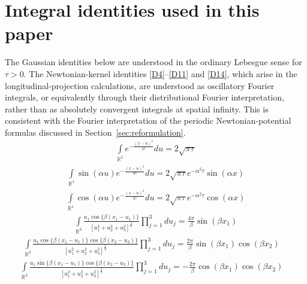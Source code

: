 \documentclass[11pt]{jfm}
\numberwithin{equation}{section}
\begin{document}
\section{Integral identities used in this paper}
\label{app:integrals}
The Gaussian identities below are understood in the ordinary Lebesgue sense for $\tau>0$. The
Newtonian-kernel identities \eqref{D4}--\eqref{D11} and \eqref{D14}, which arise in the
longitudinal-projection calculations, are understood as oscillatory Fourier integrals, or
equivalently through their distributional Fourier interpretation, rather than as absolutely
convergent integrals at spatial infinity. This is consistent with the Fourier interpretation of the periodic
Newtonian-potential formulas discussed in Section~\ref{sec:reformulation}.
\begin{eqnarray}
\label{D1}
\int\limits_{\mathbb{R}^1 } {{e^{ - \frac{{{{\left( {x - u} \right)}^2}}}{{4\tau }}}}} du = 2\sqrt {\pi \tau }
\end{eqnarray}
\begin{eqnarray}
\label{D2}
 \int\limits_{\mathbb{R}^1 }  {\sin \left( {\alpha u} \right){e^{ - \frac{{{{\left( {x - u} \right)}^2}}}{{4\tau }}}}} du = 2\sqrt {\pi \tau } {e^{ - {\alpha ^2}\tau }}\sin \left( {\alpha x} \right)
\end{eqnarray}
\begin{eqnarray}
\label{D3}
\int\limits_{\mathbb{R}^1 } {\cos \left( {\alpha u} \right){e^{ - \frac{{{{\left( {x - u} \right)}^2}}}{{4\tau }}}}} du = 2\sqrt {\pi \tau } {e^{ - {\alpha ^2}\tau }}\cos \left( {\alpha x} \right)
\end{eqnarray}
\begin{eqnarray}
\label{D4}
\int\limits_{\mathbb{R}^3 }{\frac{{u_1\cos\{\beta\left(x_1-u_1\right)\}}}{{\left[ u_1^2+u_2^2+u_3^2 \right]^{\frac{3}{2}} }}}\prod\limits_{j = 1}^3 {du_j }=\frac{4\pi}{\beta}\sin\left(\beta x_1\right)
\end{eqnarray}
\begin{eqnarray}
\label{D5}
\int\limits_{\mathbb{R}^3 }{\frac{{u_1\cos\{\beta\left(x_1-u_1\right)\}\cos\{\beta\left(x_2-u_2\right)\}}}{{\left[ u_1^2+u_2^2+u_3^2 \right]^{\frac{3}{2}} }}}\prod\limits_{j = 1}^3 {du_j }=\frac{2\pi}{\beta}\sin\left(\beta x_1\right)\cos\left(\beta x_2\right)\quad
\end{eqnarray}
\begin{eqnarray}
\label{D6}
\int\limits_{\mathbb{R}^3 }{\frac{{u_1\sin\{\beta\left(x_1-u_1\right)\}\cos\{\beta\left(x_2-u_2\right)\}}}{{\left[ u_1^2+u_2^2+u_3^2 \right]^{\frac{3}{2}} }}}\prod\limits_{j = 1}^3 {du_j }=-\frac{2\pi}{\beta}\cos\left(\beta x_1\right)\cos\left(\beta x_2\right)\quad
\end{eqnarray}
\end{document}
